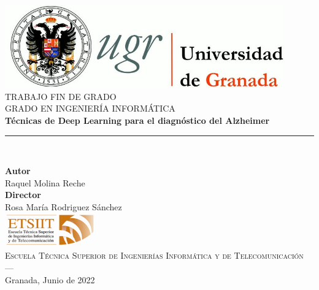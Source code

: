 \begin{titlepage}


\newlength{\centeroffset}
\setlength{\centeroffset}{-0.5\oddsidemargin}
\addtolength{\centeroffset}{0.5\evensidemargin}
\thispagestyle{empty}

\noindent\hspace*{\centeroffset}\begin{minipage}{\textwidth}

\centering
\includegraphics[width=0.9\textwidth]{logos/logo_ugr.jpg}\\[1.4cm]

\textsc{ \Large TRABAJO FIN DE GRADO\\[0.2cm]}
\textsc{ GRADO EN INGENIERÍA INFORMÁTICA}\\[1cm]
% 
{\Huge\bfseries Técnicas de Deep Learning para el diagnóstico del Alzheimer\\}
\noindent\rule[-1ex]{\textwidth}{3pt}\\[3.5ex]
\end{minipage}


\vspace{2.5cm}

\noindent\hspace*{\centeroffset}\begin{minipage}{\textwidth}
\thispagestyle{empty}
\centering

\textbf{Autor}\\ {Raquel Molina Reche}\\[2.5ex]
\textbf{Director}\\ {Rosa María Rodriguez Sánchez}\\[2cm]
\includegraphics[width=0.3\textwidth]{logos/etsiit_logo.png}\\[0.1cm]
\textsc{Escuela Técnica Superior de Ingenierías Informática y de Telecomunicación}\\
\textsc{---}\\
Granada, Junio de 2022


\end{minipage}
\end{titlepage}


